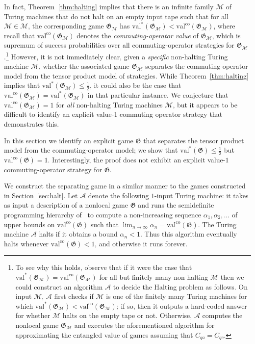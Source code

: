 \documentclass[11pt]{article}
\theoremstyle{definition}
\newcommand{\val}{\ensuremath{\mathrm{val}}}
\newcommand{\valco}{\ensuremath{\mathrm{val}^{\mathrm{co}}}}
\newcommand{\game}{\mathfrak{G}}
\newcommand{\machine}{\cal{M}}
\renewcommand{\cal}[1]{\mathcal{#1}}
\begin{document}
In fact, Theorem~\ref{thm:halting} implies that there is an infinite family
$\mathscr{M}$ of Turing machines that do not halt on an empty input tape such
that for all $\cal{M} \in \mathscr{M}$, the corresponding game $\game_\machine$
has $\val^*(\game_\machine) < \valco(\game_\machine)$, where recall that
$\valco(\game_\machine)$ denotes the \emph{commuting-operator value} of
$\game_\machine$, which is supremum of success probabilities over all
commuting-operator strategies for $\game_\machine$.\footnote{To see why this
  holds, observe that if it were the case that $\val^*(\game_\machine) =
  \valco(\game_\machine)$ for all but finitely many non-halting $\machine$
  then we could construct an algorithm $\cal{A}$ to decide the Halting problem
  as follows.
  On input $\cal{M}$, $\cal{A}$ first checks if $\cal{M}$ is one of the finitely
  many Turing machines for which $\val^*(\game_\machine) <
  \valco(\game_\machine)$; if so, then it outputs a hard-coded answer for
  whether $\cal{M}$ halts on the empty tape or not.
  Otherwise, $\cal{A}$ computes the nonlocal game $\game_\machine$ and executes
  the aforementioned algorithm for approximating the entangled value of games
  assuming that $C_{qa} = C_{qc}$.
}
However, it is not immediately clear, given a \emph{specific} non-halting Turing
machine $\cal{M}$, whether the associated game $\game_\machine$ separates the
commuting-operator model from the tensor product model of strategies.
While Theorem~\ref{thm:halting} implies that $\val^*(\game_\machine) \leq
\frac{1}{2}$, it could also be the case that $\valco(\game_\machine) =
\val^*(\game_\machine)$ in that particular instance.
We conjecture that $\valco(\game_\machine) = 1$ for \emph{all} non-halting
Turing machines $\cal{M}$, but it appears to be difficult to identify an
explicit value-$1$ commuting operator strategy that demonstrates this.

In this section we identify an explicit game $\game$ that separates the tensor
product model from the commuting-operator model; we show that $\val^*(\game)
\leq \frac{1}{2}$ but $\valco(\game) = 1$.
Interestingly, the proof does not exhibit an explicit value-$1$
commuting-operator strategy for $\game$.

We construct the separating game in a similar manner to the games constructed in
Section~\ref{sec:halt}.
Let $\cal{A}$ denote the following $1$-input Turing machine: it takes as input a
description of a nonlocal game $\game$ and runs the semidefinite programming
hierarchy of~\cite{navascues2008convergent,doherty2008quantum} to compute a
non-increasing sequence $\alpha_1,\alpha_2,\ldots$ of upper bounds on
$\valco(\game)$ such that $\lim_{n \to \infty} \alpha_n = \valco(\game)$.
The Turing machine $\cal{A}$ halts if it obtains a bound $\alpha_n < 1$.
Thus this algorithm eventually halts whenever $\valco(\game) < 1$, and
otherwise it runs forever.
\end{document}
